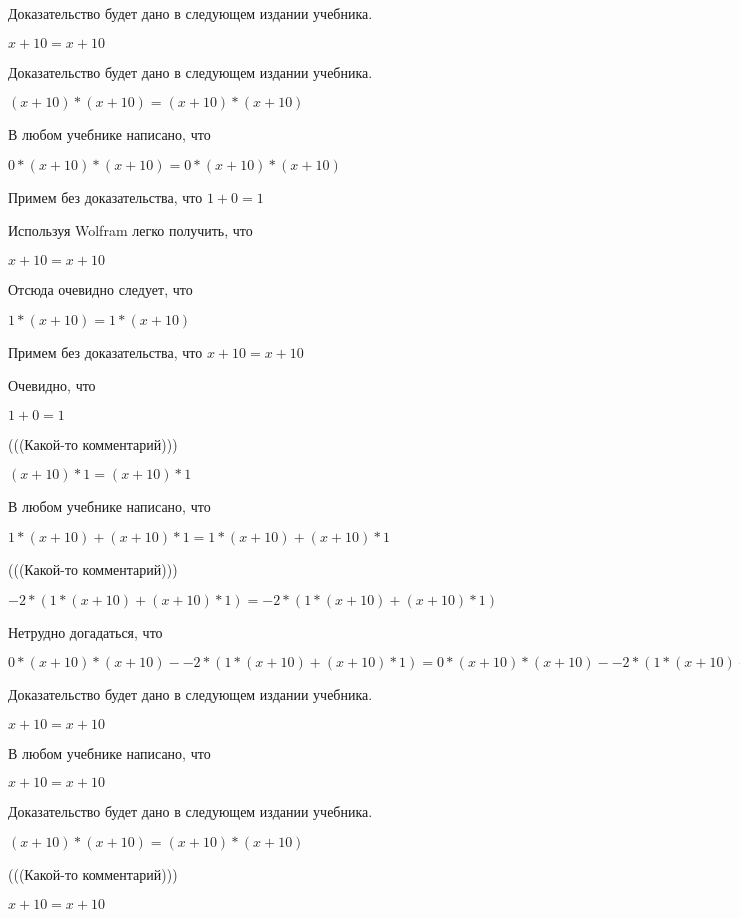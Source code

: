\documentclass[12pt,a4paper,fleqn]{article}
\theoremstyle{definition}
\begin{document}
Доказательство будет дано в следующем издании учебника.

$ x  +  10  =  x  +  10 $

Доказательство будет дано в следующем издании учебника.

$( x  +  10 ) * ( x  +  10 ) = ( x  +  10 ) * ( x  +  10 )$

В любом учебнике написано, что

$ 0  * ( x  +  10 ) * ( x  +  10 ) =  0  * ( x  +  10 ) * ( x  +  10 )$

Примем без доказательства, что
$ 1  +  0  =  1 $

Используя Wolfram легко получить, что

$ x  +  10  =  x  +  10 $

Отсюда очевидно следует, что

$ 1  * ( x  +  10 ) =  1  * ( x  +  10 )$

Примем без доказательства, что
$ x  +  10  =  x  +  10 $

Очевидно, что

$ 1  +  0  =  1 $

(((Какой-то комментарий)))

$( x  +  10 ) *  1  = ( x  +  10 ) *  1 $

В любом учебнике написано, что

$ 1  * ( x  +  10 ) + ( x  +  10 ) *  1  =  1  * ( x  +  10 ) + ( x  +  10 ) *  1 $

(((Какой-то комментарий)))

$ -2  * ( 1  * ( x  +  10 ) + ( x  +  10 ) *  1 ) =  -2  * ( 1  * ( x  +  10 ) + ( x  +  10 ) *  1 )$

Нетрудно догадаться, что

$ 0  * ( x  +  10 ) * ( x  +  10 ) -  -2  * ( 1  * ( x  +  10 ) + ( x  +  10 ) *  1 ) =  0  * ( x  +  10 ) * ( x  +  10 ) -  -2  * ( 1  * ( x  +  10 ) + ( x  +  10 ) *  1 )$

Доказательство будет дано в следующем издании учебника.

$ x  +  10  =  x  +  10 $

В любом учебнике написано, что

$ x  +  10  =  x  +  10 $

Доказательство будет дано в следующем издании учебника.

$( x  +  10 ) * ( x  +  10 ) = ( x  +  10 ) * ( x  +  10 )$

(((Какой-то комментарий)))

$ x  +  10  =  x  +  10 $
\end{document}
